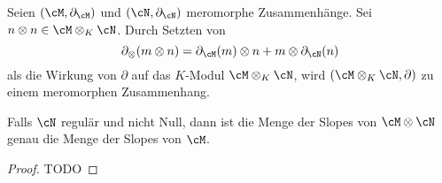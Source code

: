 \begin{prop} \label{prop:tensorZusammenhang}
Seien $(\cM,\partial_\cM)$ und $(\cN,\partial_\cN)$ meromorphe Zusammenhänge.
Sei $n\otimes n\in \cM\otimes_K\cN$.
Durch Setzten von
\begin{equation} \label{eq:TensorAbleiten}
\partial_\otimes(m\otimes n)=\partial_\cM(m)\otimes n +m\otimes \partial_\cN(n)
\end{equation}
als die Wirkung von $\partial$ auf das $K$-Modul $\cM\otimes_K\cN$, wird
$(\cM\otimes_K\cN,\partial)$ zu einem meromorphen Zusammenhang.
\begin{comment}
\cite[Prop 4.1.1]{SchneidersDmod}
\end{comment}
\end{prop}
\begin{comment}
\begin{proof}
Klar
\end{proof}
\end{comment}
\begin{lem} \cite[Ex 5.3.7]{sabbah_cimpa90}
Falls $\cN$ regulär und nicht Null, dann ist die Menge der Slopes von
$\cM\otimes\cN$ genau die Menge der Slopes von $\cM$.
\end{lem}
\begin{proof}
TODO
\end{proof}

